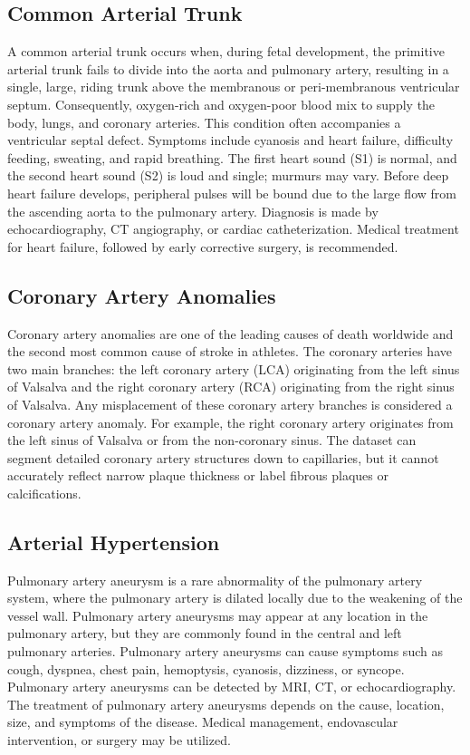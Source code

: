 \documentclass{article}
\begin{document}
\subsection{Common Arterial Trunk}
A common arterial trunk occurs when, during fetal development, the primitive arterial trunk fails to divide into the aorta and pulmonary artery, resulting in a single, large, riding trunk above the membranous or peri-membranous ventricular septum. Consequently, oxygen-rich and oxygen-poor blood mix to supply the body, lungs, and coronary arteries. This condition often accompanies a ventricular septal defect. Symptoms include cyanosis and heart failure, difficulty feeding, sweating, and rapid breathing. The first heart sound (S1) is normal, and the second heart sound (S2) is loud and single; murmurs may vary. Before deep heart failure develops, peripheral pulses will be bound due to the large flow from the ascending aorta to the pulmonary artery. Diagnosis is made by echocardiography, CT angiography, or cardiac catheterization. Medical treatment for heart failure, followed by early corrective surgery, is recommended.

\subsection{Coronary Artery Anomalies}
Coronary artery anomalies are one of the leading causes of death worldwide and the second most common cause of stroke in athletes. The coronary arteries have two main branches: the left coronary artery (LCA) originating from the left sinus of Valsalva and the right coronary artery (RCA) originating from the right sinus of Valsalva. Any misplacement of these coronary artery branches is considered a coronary artery anomaly. For example, the right coronary artery originates from the left sinus of Valsalva or from the non-coronary sinus. The dataset can segment detailed coronary artery structures down to capillaries, but it cannot accurately reflect narrow plaque thickness or label fibrous plaques or calcifications.

\subsection{Arterial Hypertension}
Pulmonary artery aneurysm is a rare abnormality of the pulmonary artery system, where the pulmonary artery is dilated locally due to the weakening of the vessel wall. Pulmonary artery aneurysms may appear at any location in the pulmonary artery, but they are commonly found in the central and left pulmonary arteries. Pulmonary artery aneurysms can cause symptoms such as cough, dyspnea, chest pain, hemoptysis, cyanosis, dizziness, or syncope. Pulmonary artery aneurysms can be detected by MRI, CT, or echocardiography. The treatment of pulmonary artery aneurysms depends on the cause, location, size, and symptoms of the disease. Medical management, endovascular intervention, or surgery may be utilized.
\end{document}
